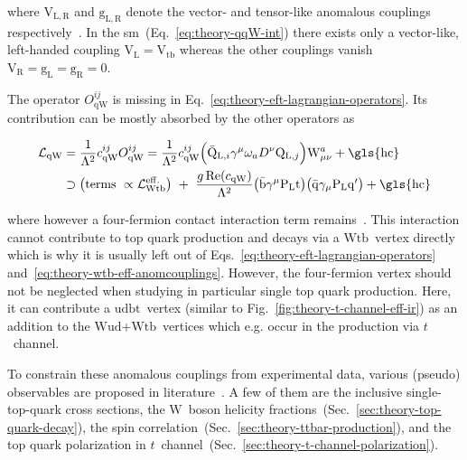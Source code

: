 where $\mathrm{V}_\mathrm{L,R}$ and $\mathrm{g}_\mathrm{L,R}$ denote the vector- and tensor-like anomalous couplings respectively~\cite{AguilarSaavedra:2008zc}. In the \gls{sm}~(Eq.~\ref{eq:theory-qqW-int}) there exists only a vector-like, left-handed coupling $\mathrm{V}_\mathrm{L}=\mathrm{V}_\mathrm{tb}$ whereas the other couplings vanish $\mathrm{V}_\mathrm{R}=\mathrm{g}_\mathrm{L}=\mathrm{g}_\mathrm{R}=0$.

The operator $O_\mathrm{qW}^{ij}$ is missing in Eq.~\ref{eq:theory-eft-lagrangian-operators}. Its contribution can be mostly absorbed by the other operators as

\begin{align}
\mathcal{L}_\mathrm{qW}&=\frac{1}{\Lambda^2}c^{ij}_\mathrm{qW}O_\mathrm{qW}^{ij}=\frac{1}{\Lambda^2}c^{ij}_\mathrm{qW}\Big(\bar{\mathrm{Q}}_{\mathrm{L},i}\gamma^{\mu}\omega_{a}D^\nu\mathrm{Q}_{\mathrm{L},j}\Big)\mathrm{W}_{\mu\nu}^{a}+\mathrm{\gls{hc}}\nonumber\\
&\supset\big(\text{terms }\propto\mathcal{L}_\mathrm{Wtb}^\mathrm{eff.}\big)~+~\frac{g\,\mathrm{Re}(c_\mathrm{qW})}{\Lambda^2}\big(\bar{\mathrm{b}}\gamma^{\mu}\mathrm{P}_\mathrm{L}\mathrm{t}\big)\big(\bar{\mathrm{q}}\gamma_\mu\mathrm{P}_\mathrm{L}\mathrm{q}^\prime\big)+\mathrm{\gls{hc}}\label{eq:theory-wtb-eff-anomcouplings}
\end{align}

where however a four-fermion contact interaction term remains~\cite{Bach:2012fb}. This interaction cannot contribute to top quark production and decays via a $\mathrm{Wtb}$~vertex directly which is why it is usually left out of Eqs.~\ref{eq:theory-eft-lagrangian-operators} and~\ref{eq:theory-wtb-eff-anomcouplings}. However, the four-fermion vertex should not be neglected when studying in particular single top quark production. Here, it can contribute a $\mathrm{udbt}$~vertex (similar to Fig.~\ref{fig:theory-t-channel-eff-ir}) as an addition to the $\mathrm{Wud}\text{+}\mathrm{Wtb}$~vertices which e.g. occur in the production via $t$~channel.

To constrain these anomalous couplings from experimental data, various (pseudo) observables are proposed in literature~\cite{AguilarSaavedra:2010nx,Aguilar-Saavedra:2014eqa,Bernreuther:2015yna}. A few of them are the inclusive single-top-quark cross sections, the $\mathrm{W}$~boson helicity fractions~(Sec.~\ref{sec:theory-top-quark-decay}), the \ttbar spin correlation~(Sec.~\ref{sec:theory-ttbar-production}), and the top quark polarization in $t$~channel~(Sec.~\ref{sec:theory-t-channel-polarization}).



